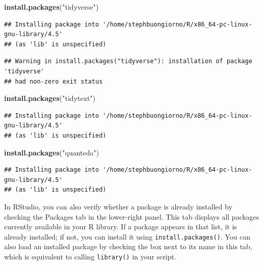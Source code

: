 \documentclass[
]{article}
\newenvironment{Shaded}{\begin{snugshade}}{\end{snugshade}}
\newcommand{\FunctionTok}[1]{\textcolor[rgb]{0.13,0.29,0.53}{\textbf{#1}}}
\newcommand{\NormalTok}[1]{#1}
\newcommand{\StringTok}[1]{\textcolor[rgb]{0.31,0.60,0.02}{#1}}
\begin{document}
\begin{Shaded}
\begin{Highlighting}[]
\FunctionTok{install.packages}\NormalTok{(}\StringTok{"tidyverse"}\NormalTok{)}
\end{Highlighting}
\end{Shaded}

\begin{verbatim}
## Installing package into '/home/stephbuongiorno/R/x86_64-pc-linux-gnu-library/4.5'
## (as 'lib' is unspecified)
\end{verbatim}

\begin{verbatim}
## Warning in install.packages("tidyverse"): installation of package 'tidyverse'
## had non-zero exit status
\end{verbatim}

\begin{Shaded}
\begin{Highlighting}[]
\FunctionTok{install.packages}\NormalTok{(}\StringTok{"tidytext"}\NormalTok{)}
\end{Highlighting}
\end{Shaded}

\begin{verbatim}
## Installing package into '/home/stephbuongiorno/R/x86_64-pc-linux-gnu-library/4.5'
## (as 'lib' is unspecified)
\end{verbatim}

\begin{Shaded}
\begin{Highlighting}[]
\FunctionTok{install.packages}\NormalTok{(}\StringTok{"quanteda"}\NormalTok{)}
\end{Highlighting}
\end{Shaded}

\begin{verbatim}
## Installing package into '/home/stephbuongiorno/R/x86_64-pc-linux-gnu-library/4.5'
## (as 'lib' is unspecified)
\end{verbatim}

In RStudio, you can also verify whether a package is already installed
by checking the Packages tab in the lower-right panel. This tab displays
all packages currently available in your R library. If a package appears
in that list, it is already installed; if not, you can install it using
\texttt{install.packages()}. You can also load an installed package by
checking the box next to its name in this tab, which is equivalent to
calling \texttt{library()} in your script.
\end{document}
